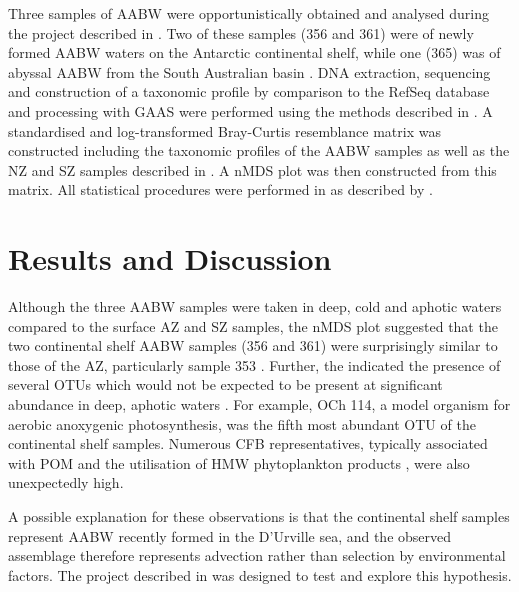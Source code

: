 


Three samples of \ac{AABW} were opportunistically obtained and analysed during the project described in  .
Two of these samples (356 and 361) were of newly formed \ac{AABW} waters on the Antarctic continental shelf, while one (365) was of abyssal \ac{AABW} from the South Australian basin .
DNA extraction, sequencing and construction of a taxonomic profile by  comparison to the RefSeq database and processing with \ac{GAAS} were performed using the methods described in .
A standardised and log-transformed Bray-Curtis resemblance matrix was constructed including the taxonomic profiles of the \ac{AABW} samples as well as the \ac{NZ} and \ac{SZ} samples described in .
A \ac{nMDS} plot was then constructed from this matrix.
All statistical procedures were performed in  as described by \citet{Clarke:2001ut}.

\section{Results and Discussion}

Although the three \ac{AABW} samples were taken in deep, cold and aphotic waters  compared to the surface \ac{AZ} and \ac{SZ} samples, the \ac{nMDS} plot suggested that the two continental shelf \ac{AABW} samples (356 and 361) were surprisingly similar to those of the \ac{AZ}, particularly sample 353 .
Further, the indicated the presence of several \acp{OTU} which would not be expected to be present at significant abundance in deep, aphotic waters .
For example,  OCh 114, a model organism for aerobic anoxygenic photosynthesis, was the fifth most abundant \ac{OTU} of the continental shelf samples.
Numerous \ac{CFB} representatives, typically associated with \ac{POM} and the utilisation of \ac{HMW} phytoplankton products \citep[e.g.][]{Williams:2012gsa}, were also unexpectedly high.



A possible explanation for these observations is that the continental shelf samples represent \ac{AABW} recently formed in the D'Urville sea, and the observed assemblage therefore represents advection rather than selection by environmental factors.
The project described in  was designed to test and explore this hypothesis.


